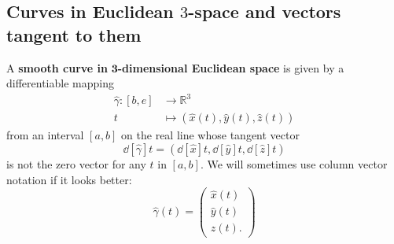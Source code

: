 \documentclass[newpage,hints,handout]{ximera}
\begin{document}


\subsection*{Curves in Euclidean $3$-space and vectors tangent to them}

\begin{definition}
A \textbf{smooth curve in }$\mathbf{3}$\textbf{-dimensional Euclidean space}
is given by a differentiable mapping%
\begin{align*}
\hat{\gamma}:[b,e] &\rightarrow \mathbb{R}^{3}\\
t &\mapsto (\hat{x}(t), \hat{y}(t), \hat{z}(t))
\end{align*}
from an interval $[a,b]$ on the real line whose tangent vector
\[
\dd[\hat{\gamma}]{t} =\left(
  \dd[\hat{x}]{t},
  \dd[\hat{y}]{t},
  \dd[\hat{z}]{t}
\right)
\]
is not the zero vector for any $t$ in $[a,b]$.  We will sometimes use column
vector notation if it looks better:%
\[
\hat{\gamma}(t) = \begin{pmatrix}
  \hat{x}(t)\\
  \hat{y}(t)\\
  \hat{z}(t).
\end{pmatrix}
\]
\end{definition}
\end{document}
